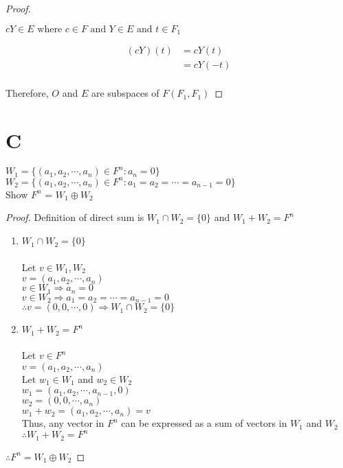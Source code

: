 \documentclass[11pt]{scrartcl}
\makeatletter
\newenvironment{Dequation}
  {%
  \def\tagform@##1{%
    \maketag@@@{\makebox[0pt][r]{(\ignorespaces##1\unskip\@@italiccorr)}}}%
  \ignorespaces
  }
  {%
  \def\tagform@##1{\maketag@@@{(\ignorespaces##1\unskip\@@italiccorr)}}%
  \ignorespacesafterend
  }
\makeatother
\begin{document}
\begin{proof}
\begin{enumerate}[label=\alph*.]
{			$cY \in E \text{ where } c \in F \text{ and } Y \in E \text{ and } t \in F_1$
			\begin{Dequation}
			\begin{align*}
				(cY)(t) & = cY(t) \\
						 & = cY(-t) \\
			\end{align*}
			\end{Dequation}
		}
	\end{enumerate}	
	Therefore, $O$ and $E$ are subspaces of $F(F_1,F_1)$
\end{proof}

\section{C}
$W_1 = \{(a_1, a_2, \cdots, a_n) \in F^n : a_n = 0 \}$ \\
$W_2 = \{(a_1, a_2, \cdots, a_n) \in F^n : a_1 = a_2 = \cdots = a_{n-1} = 0 \}$ \\
Show $F^n$ = $W_1 \oplus W_2$
\begin{proof}
Definition of direct sum is $W_1 \cap W_2 = \{0\}$ and $W_1 + W_2 = F^n$
\begin{enumerate}[label=\alph*.]
	\item{
		$W_1 \cap W_2 = \{0\}$\\
		\-\\Let $v \in W_1,W_2$\\
		$v = (a_1, a_2, \cdots, a_n)$\\
		$v \in W_1 \Rightarrow a_n = 0$\\
		$v \in W_2 \Rightarrow a_1 = a_2 = \cdots = a_{n-1} = 0 $\\
		$\therefore v = (0, 0, \cdots, 0) \Rightarrow W_1 \cap W_2 = \{0\}$
		}
	\item{
		$W_1 + W_2 = F^n$\\
		\-\\ Let $v \in F^n$\\
		$v = (a_1, a_2, \cdots, a_n)$\\
		Let $w_1 \in W_1$ and $w_2 \in W_2$\\
		$w_1 = (a_1, a_2, \cdots, a_{n-1}, 0)$\\
		$w_2 = (0, 0, \cdots, a_n)$\\
		$w_1 + w_2 = (a_1, a_2, \cdots, a_n) = v$\\
		Thus, any vector in $F^n$ can be expressed as a sum of vectors in $W_1$ and $W_2$\\
		$\therefore W_1 + W_2 = F^n$
		}
\end{enumerate}
$\therefore F^n = W_1 \oplus W_2$
\end{proof}
\end{document}
